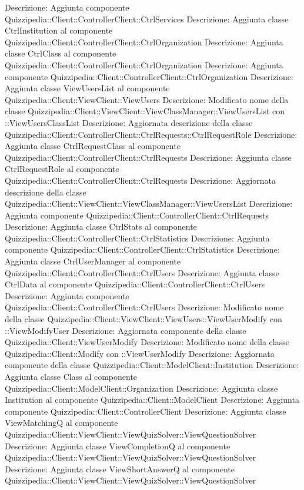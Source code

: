 Descrizione: Aggiunta componente Quizzipedia::Client::ControllerClient::CtrlServices 
Descrizione: Aggiunta classe CtrlInstitution al componente Quizzipedia::Client::ControllerClient::CtrlOrganization 
Descrizione: Aggiunta classe CtrlClass al componente Quizzipedia::Client::ControllerClient::CtrlOrganization 
Descrizione: Aggiunta componente Quizzipedia::Client::ControllerClient::CtrlOrganization 
Descrizione: Aggiunta classe ViewUsersList al componente Quizzipedia::Client::ViewClient::ViewUsers 
Descrizione: Modificato nome della classe Quizzipedia::Client::ViewClient::ViewClassManager::ViewUsersList con ::ViewUsersClassList 
Descrizione: Aggiornata descrizione della classe Quizzipedia::Client::ControllerClient::CtrlRequests::CtrlRequestRole 
Descrizione: Aggiunta classe CtrlRequestClass al componente Quizzipedia::Client::ControllerClient::CtrlRequests 
Descrizione: Aggiunta classe CtrlRequestRole al componente Quizzipedia::Client::ControllerClient::CtrlRequests 
Descrizione: Aggiornata descrizione della classe Quizzipedia::Client::ViewClient::ViewClassManager::ViewUsersList 
Descrizione: Aggiunta componente Quizzipedia::Client::ControllerClient::CtrlRequests 
Descrizione: Aggiunta classe CtrlStats al componente Quizzipedia::Client::ControllerClient::CtrlStatistics 
Descrizione: Aggiunta componente Quizzipedia::Client::ControllerClient::CtrlStatistics 
Descrizione: Aggiunta classe CtrlUserManager al componente Quizzipedia::Client::ControllerClient::CtrlUsers 
Descrizione: Aggiunta classe CtrlData al componente Quizzipedia::Client::ControllerClient::CtrlUsers 
Descrizione: Aggiunta componente Quizzipedia::Client::ControllerClient::CtrlUsers 
Descrizione: Modificato nome della classe Quizzipedia::Client::ViewClient::ViewUsers::ViewUserModify con ::ViewModifyUser 
Descrizione: Aggiornata componente della classe Quizzipedia::Client::ViewUserModify 
Descrizione: Modificato nome della classe Quizzipedia::Client::Modify con ::ViewUserModify 
Descrizione: Aggiornata componente della classe Quizzipedia::Client::ModelClient::Institution 
Descrizione: Aggiunta classe Class al componente Quizzipedia::Client::ModelClient::Organization 
Descrizione: Aggiunta classe Institution al componente Quizzipedia::Client::ModelClient 
Descrizione: Aggiunta componente Quizzipedia::Client::ControllerClient 
Descrizione: Aggiunta classe ViewMatchingQ al componente Quizzipedia::Client::ViewClient::ViewQuizSolver::ViewQuestionSolver 
Descrizione: Aggiunta classe ViewCompletionQ al componente Quizzipedia::Client::ViewClient::ViewQuizSolver::ViewQuestionSolver 
Descrizione: Aggiunta classe ViewShortAnswerQ al componente Quizzipedia::Client::ViewClient::ViewQuizSolver::ViewQuestionSolver 
